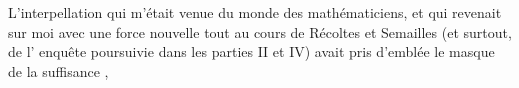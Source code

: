 L'interpellation qui m'était venue du monde des mathématiciens, et qui revenait sur moi avec une force nouvelle tout au cours  de Récoltes et Semailles (et surtout,  de l' enquête poursuivie dans les parties II et IV) avait pris d'emblée le masque de la suffisance ,
